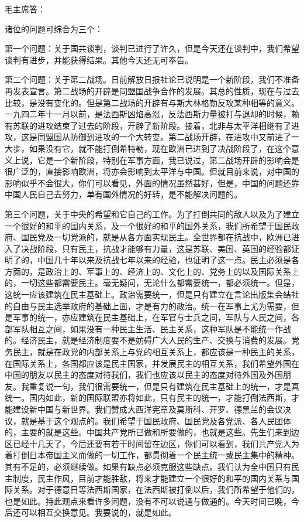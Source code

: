 毛主席答：

诸位的问题可综合为三个：

第一个问题：关于国共谈判，谈判已进行了许久，但是今天还在谈判中，我们希望谈判有进步，并能获得结果。其他今天还无可奉告。

第二个问题：关于第二战场。日前解放日报社论已说明是一个新阶段，我们不准备再发表宣言。第二战场的开辟是同盟国战争合作的发展。其总的性质，现在与过去比较，是没有变化的。但是第二战场的开辟有与斯大林格勒反攻某种相等的意义。一九四二年十一月以前，是法西斯凶焰高涨，反法西斯力量被打与退却的时候，赖有苏联的进攻结束了过去的阶段，开辟了新阶段。接着，北非与太平洋相继有了进攻，这是同盟国从防御到进攻的一个大转变。第二战场开辟，在进攻中又前进了一大步，如果没有它，就不能打倒希特勒，现在欧洲已进到了决战阶段了，在这个意义上说，它是一个新阶段，特别在军事方面，我已说过，第二战场开辟的影响会是很广泛的，直接影响欧洲，将亦会影响到太平洋与中国。但就目前来说，对中国的影响似乎不会很大，你们可以看见，外面的情况虽然甚好，但是，中国的问题还靠中国人民自己去努力，单有国外情况的好转，是不能解决问题的。

第三个问题，关于中央的希望和它自己的工作。为了打倒共同的敌人以及为了建立一个很好的和平的国内关系，及一个很好的和平的国外关系，我们所希望于国民政府、国民党及一切党派的，就是从各方面实现民主。全世界都在抗战中，欧洲已进入了决战阶段，只有民主，抗战才能够有力量，这是苏联、美国、英国的经验都证明了的，中国几十年以来及抗战七年以来的经验，也证明了这一点。民主必须是各方面的，是政治上的、军事上的、经济上的、文化上的、党务上的以及国际关系上的，一切这些都需要民主。毫无疑问，无论什么都需要统一，都必须统一。但是，这统一应该建筑在民主基础上。政治需要统一，但是只有建立在言论出版集会结社的自由与民主选举政府的基础上面，才是有力的政治。统一在军事上尤为需要，但是军事的统一，亦应建筑在民主基础上，在军官与士兵之间，军队与人民之间，各部军队相互之间，如果没有一种民主生活、民主关系，这种军队是不能统一作战的。经济民主，就是经济制度要不是妨碍广大人民的生产、交换与消费的发展。党务民主，就是在政党的内部关系上与党的相互关系上，都应该是一种民主的关系，在国际关系上，各国都应该是民主国家，并发展民主的相互关系，我们希望外国在中国的朋友以民主的态度对待我们，我们也应该以民主的态度对待外国及外国朋友。我重复说一句，我们很需要统一，但是只有建筑在民主基础上的统一，才是真统一。国内如此，新的国际联盟亦将如此，只有民主的统一，才能打倒法西斯，才能建设新中国与新世界。我们赞成大西洋宪章及莫斯科、开罗、德黑兰的会议决议，就是基于这个观点的。我们希望于国民政府、国民党及各党派、各人民团体的，主要的就是这些。中国共产党所已做和所要做的，也就是这些。先生们来到边区已经十几天了，今后还要有若干时间留在边区，你们可以看到，我们共产党人为着打倒日本帝国主义而做的一切工作，都贯彻着一个民主统一或民主集中的精神。其有不足的，必须继续做。如果有缺点必须克服这些缺点。我们认为全中国只有民主制度，民主作风，目前才能胜敌，将来才能建立一个很好的和平的国内关系与国际关系。对于德意日等法西斯国家，在法西斯被打倒以后，我们所希望于他们的，也是如此。持此观点来看许多问题，没有不可以说通与做通的。今天时间已晚，今后还可以相互交换意见。我要说的，就是如此。


